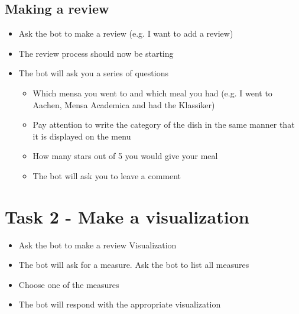 \subsection*{Making a review}
\begin{itemize}
    \item Ask the bot to make a review (e.g. I want to add a review)
    \item The review process should now be starting 
    \item The bot will ask you a series of questions
    \begin{itemize}
      \item Which mensa you went to and which meal you had (e.g. I went to Aachen, Mensa Academica and had the Klassiker) 
      \item Pay attention to write the category of the dish in the same manner that it is displayed on the menu
      \item How many stars out of 5 you would give your meal
      \item The bot will ask you to leave a comment
    \end{itemize}
\end{itemize}

\section*{Task 2 - Make a visualization}

\begin{itemize}
    \item Ask the bot to make a review Visualization
    \item The bot will ask for a measure. Ask the bot to list all measures
    \item Choose one of the measures 
    \item The bot will respond with the appropriate visualization
\end{itemize}


